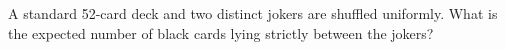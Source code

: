 A standard 52-card deck and two distinct jokers are shuffled uniformly. What is the expected number of black cards lying strictly between the jokers?
